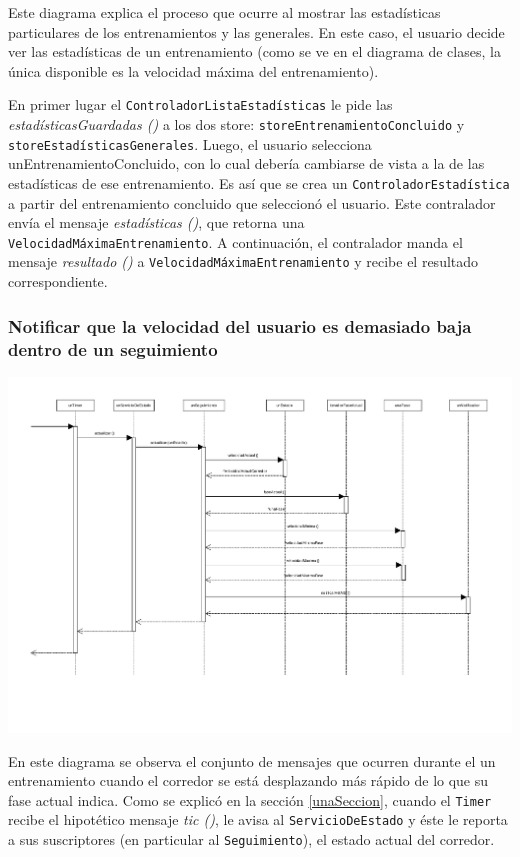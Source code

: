 Este diagrama explica el proceso que ocurre al mostrar las estadísticas particulares de los entrenamientos y las generales. En este caso, el usuario decide ver las estadísticas de un entrenamiento (como se ve en el diagrama de clases, la única disponible es la velocidad máxima del entrenamiento).


En primer lugar el \texttt{ControladorListaEstadísticas} le pide las \emph{estadísticasGuardadas ()} a los dos store: \texttt{storeEntrenamientoConcluido} y \texttt{storeEstadísticasGenerales}. Luego, el usuario selecciona {unEntrenamientoConcluido}, con lo cual debería cambiarse de vista a la de las estadísticas de ese entrenamiento. Es así que se crea un \texttt{ControladorEstadística} a partir del entrenamiento concluido que seleccionó el usuario. Este contralador envía el mensaje \emph{estadísticas ()}, que retorna una \texttt{VelocidadMáximaEntrenamiento}. A continuación, el contralador manda el mensaje \emph{resultado ()} a \texttt{VelocidadMáximaEntrenamiento} y recibe el resultado correspondiente. 

\subsubsection{Notificar que la velocidad del usuario es demasiado baja dentro de un seguimiento}
\begin{center}
	\includegraphics[scale=0.5]{images/Velocidad.pdf}
\end{center}

En este diagrama se observa el conjunto de mensajes que ocurren durante el un entrenamiento cuando el corredor se está desplazando más rápido de lo que su fase actual indica. Como se explicó en la sección \ref{unaSeccion}, cuando el \texttt{Timer} recibe el hipotético mensaje \emph{tic ()}, le avisa al \texttt{ServicioDeEstado} y éste le reporta a sus suscriptores (en particular al \texttt{Seguimiento}), el estado actual del corredor.

